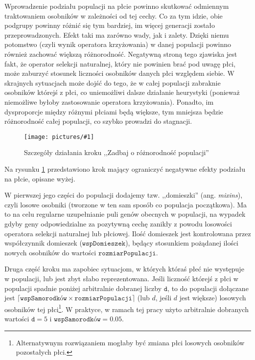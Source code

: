 \documentclass[twoside]{iisthesis}
\newcommand{\param}[1]{\mathtt{#1}}
\newcommand{\img}[1]{\centering \texttt{[image: pictures/\#1]}}
\begin{document}
Wprowadzenie podziału populacji na płcie powinno skutkować odmiennym traktowaniem osobników w zależności od tej cechy. 
Co za tym idzie, obie podgrupy powinny różnić się tym bardziej, im więcej generacji zostało przeprowadzonych.
Efekt taki ma zarówno wady, jak i zalety. 
Dzięki niemu potomstwo (czyli wynik operatora krzyżowania) w danej populacji powinno również zachować większą różnorodność. 
Negatywną stroną tego zjawiska jest fakt, że operator selekcji naturalnej, który nie powinien brać pod uwagę płci, może zaburzyć stosunek liczności osobników danych płci względem siebie. 
W skrajnych sytuacjach może dojść do tego, że w całej populacji zabraknie osobników którejś z płci, co uniemożliwi dalsze działanie heurystyki (ponieważ niemożliwe byłoby zastosowanie operatora krzyżowania). 
Ponadto, im dysproporcje między różnymi płciami będą większe, tym mniejsza będzie różnorodność całej populacji, co szybko prowadzi do stagnacji.

\begin{figure}[H]
	\caption{Szczegóły działania kroku ,,Zadbaj o różnorodność populacji'' \label{figure:fixing}}
	\img{fixing.png}
\end{figure}

Na rysunku \ref{figure:fixing} przedstawiono krok mający ograniczyć negatywne efekty podziału na płcie, opisane wyżej. 

W pierwszej jego części do populacji dodajemy tzw. ,,domieszki'' (ang. \emph{mixins}), czyli losowe osobniki (tworzone w ten sam sposób co populacja początkowa). 
Ma to na celu regularne uzupełnianie puli genów obecnych w populacji, na wypadek gdyby geny odpowiedzialne za pozytywną cechę zanikły z powodu losowości operatora selekcji naturalnej lub płciowej. 
Ilość domieszek jest kontrolowana przez współczynnik domieszek ($\param{wspDomieszek}$), będący stosunkiem pożądanej ilości nowych osobników do wartości $\param{rozmiarPopulacji}$.

Druga część kroku ma zapobiec sytuacjom, w których któraś płeć nie występuje w populacji, lub jest zbyt słabo reprezentowana. 
Jeśli liczność którejś z płci w populacji spadnie poniżej arbitralnie dobranej liczby $\param{d}$, to do populacji dołączane jest $\lceil \param{wspSamorodków} \times \param{rozmiarPopulacji} \rceil$ (lub $d$, jeśli $d$ jest większe) losowych osobników tej płci\footnote{
	Alternatywnym rozwiązaniem mogłaby być zmiana płci losowych osobników pozostałych płci.
}. 
W praktyce, w ramach tej pracy użyto arbitralnie dobranych wartości $\param{d} = 5$ i $\param{wspSamorodków} = 0.05$.
\end{document}
